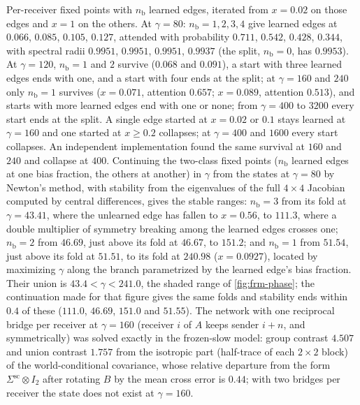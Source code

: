 \begin{numcheck}\label{chk:frm-bridged}
Per-receiver fixed points with $n_{\mathrm b}$ learned edges, iterated from $x=0.02$ on those edges and $x=1$ on the others. At $\gamma=80$: $n_{\mathrm b}=1,2,3,4$ give learned edges at $0.066$, $0.085$, $0.105$, $0.127$, attended with probability $0.711$, $0.542$, $0.428$, $0.344$, with spectral radii $0.9951$, $0.9951$, $0.9951$, $0.9937$ (the split, $n_{\mathrm b}=0$, has $0.9953$). At $\gamma=120$, $n_{\mathrm b}=1$ and $2$ survive ($0.068$ and $0.091$), a start with three learned edges ends with one, and a start with four ends at the split; at $\gamma=160$ and $240$ only $n_{\mathrm b}=1$ survives ($x=0.071$, attention $0.657$; $x=0.089$, attention $0.513$), and starts with more learned edges end with one or none; from $\gamma=400$ to $3200$ every start ends at the split. A single edge started at $x=0.02$ or $0.1$ stays learned at $\gamma=160$ and one started at $x\ge0.2$ collapses; at $\gamma=400$ and $1600$ every start collapses. An independent implementation found the same survival at $160$ and $240$ and collapse at $400$. Continuing the two-class fixed points ($n_{\mathrm b}$ learned edges at one bias fraction, the others at another) in $\gamma$ from the states at $\gamma=80$ by Newton's method, with stability from the eigenvalues of the full $4\times4$ Jacobian computed by central differences, gives the stable ranges: $n_{\mathrm b}=3$ from its fold at $\gamma=43.41$, where the unlearned edge has fallen to $x=0.56$, to $111.3$, where a double multiplier of symmetry breaking among the learned edges crosses one; $n_{\mathrm b}=2$ from $46.69$, just above its fold at $46.67$, to $151.2$; and $n_{\mathrm b}=1$ from $51.54$, just above its fold at $51.51$, to its fold at $240.98$ ($x=0.0927$), located by maximizing $\gamma$ along the branch parametrized by the learned edge's bias fraction. Their union is $43.4<\gamma<241.0$, the shaded range of \cref{fig:frm-phase}; the continuation made for that figure gives the same folds and stability ends within $0.4$ of these ($111.0$, $46.69$, $151.0$ and $51.55$). The network with one reciprocal bridge per receiver at $\gamma=160$ (receiver $i$ of $A$ keeps sender $i+n$, and symmetrically) was solved exactly in the frozen-slow model: group contrast $4.507$ and union contrast $1.757$ from the isotropic part (half-trace of each $2\times2$ block) of the world-conditional covariance, whose relative departure from the form $\Sigma^{\mathrm{sc}}\otimes I_2$ after rotating $B$ by the mean cross error is $0.44$; with two bridges per receiver the state does not exist at $\gamma=160$.
\end{numcheck}

